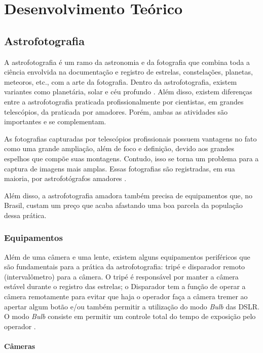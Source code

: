 \chapter{Desenvolvimento Teórico}

\section{Astrofotografia}

A astrofotografia é um ramo da astronomia e da fotografia que combina toda a ciência envolvida na documentação e registro de estrelas, constelações, planetas, meteoros, etc., com a arte da fotografia. Dentro da astrofotografia, existem variantes como planetária, solar e céu profundo \cite{livro:astropratica}. Além disso, existem diferenças entre a astrofotografia praticada profissionalmente por cientistas, em grandes telescópios, da praticada por amadores. Porém, ambas as atividades são importantes e se complementam.

As fotografias capturadas por telescópios profissionais possuem vantagens no fato como uma grande ampliação, além de foco e definição, devido aos grandes espelhos que compõe suas montagens. Contudo, isso se torna um problema para a captura de imagens mais amplas. Essas fotografias são registradas, em sua maioria, por astrofotógrafos amadores \cite{livro:astropratica}.

Além disso, a astrofotografia amadora também precisa de equipamentos que, no Brasil, custam um preço que acaba afastando uma boa parcela da população dessa prática.

\subsection{Equipamentos}

Além de uma câmera e uma lente, existem alguns equipamentos periféricos que são fundamentais para a prática da astrofotografia: tripé e disparador remoto (intervalômetro) para a câmera. O tripé é responsável por manter a câmera estável durante o registro das estrelas; o Disparador tem a função de operar a câmera remotamente para evitar que haja o operador faça a câmera tremer ao apertar algum botão e/ou também permitir a utilização do modo \textit{Bulb} das DSLR. O modo \textit{Bulb} consiste em permitir um controle total do tempo de exposição pelo operador \cite{book:bbcsky}.

\subsubsection{Câmeras}

